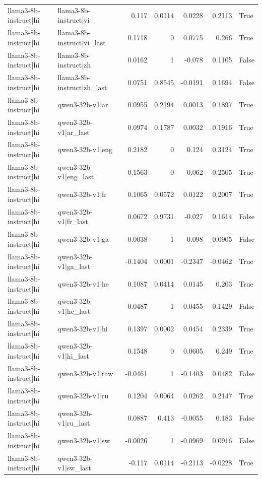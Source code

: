 \begin{table}
\begin{tabular}{l l r r r r l}
llama3-8b-instruct|hi & llama3-8b-instruct|vi & 0.117 & 0.0114 & 0.0228 & 0.2113 & True \\
llama3-8b-instruct|hi & llama3-8b-instruct|vi_last & 0.1718 & 0 & 0.0775 & 0.266 & True \\
llama3-8b-instruct|hi & llama3-8b-instruct|zh & 0.0162 & 1 & -0.078 & 0.1105 & False \\
llama3-8b-instruct|hi & llama3-8b-instruct|zh_last & 0.0751 & 0.8545 & -0.0191 & 0.1694 & False \\
llama3-8b-instruct|hi & qwen3-32b-v1|ar & 0.0955 & 0.2194 & 0.0013 & 0.1897 & True \\
llama3-8b-instruct|hi & qwen3-32b-v1|ar_last & 0.0974 & 0.1787 & 0.0032 & 0.1916 & True \\
llama3-8b-instruct|hi & qwen3-32b-v1|eng & 0.2182 & 0 & 0.124 & 0.3124 & True \\
llama3-8b-instruct|hi & qwen3-32b-v1|eng_last & 0.1563 & 0 & 0.062 & 0.2505 & True \\
llama3-8b-instruct|hi & qwen3-32b-v1|fr & 0.1065 & 0.0572 & 0.0122 & 0.2007 & True \\
llama3-8b-instruct|hi & qwen3-32b-v1|fr_last & 0.0672 & 0.9731 & -0.027 & 0.1614 & False \\
llama3-8b-instruct|hi & qwen3-32b-v1|ga & -0.0038 & 1 & -0.098 & 0.0905 & False \\
llama3-8b-instruct|hi & qwen3-32b-v1|ga_last & -0.1404 & 0.0001 & -0.2347 & -0.0462 & True \\
llama3-8b-instruct|hi & qwen3-32b-v1|he & 0.1087 & 0.0414 & 0.0145 & 0.203 & True \\
llama3-8b-instruct|hi & qwen3-32b-v1|he_last & 0.0487 & 1 & -0.0455 & 0.1429 & False \\
llama3-8b-instruct|hi & qwen3-32b-v1|hi & 0.1397 & 0.0002 & 0.0454 & 0.2339 & True \\
llama3-8b-instruct|hi & qwen3-32b-v1|hi_last & 0.1548 & 0 & 0.0605 & 0.249 & True \\
llama3-8b-instruct|hi & qwen3-32b-v1|raw & -0.0461 & 1 & -0.1403 & 0.0482 & False \\
llama3-8b-instruct|hi & qwen3-32b-v1|ru & 0.1204 & 0.0064 & 0.0262 & 0.2147 & True \\
llama3-8b-instruct|hi & qwen3-32b-v1|ru_last & 0.0887 & 0.413 & -0.0055 & 0.183 & False \\
llama3-8b-instruct|hi & qwen3-32b-v1|sw & -0.0026 & 1 & -0.0969 & 0.0916 & False \\
llama3-8b-instruct|hi & qwen3-32b-v1|sw_last & -0.117 & 0.0114 & -0.2113 & -0.0228 & True \\

\end{tabular}
\end{table}
